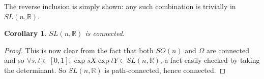 \documentclass[12pt]{article}
\newtheorem{cor}[thm]{Corollary}
\theoremstyle{definition}
\begin{document}
The reverse inclusion is simply shown: any such combination is trivially in $SL(n,\mathbb{R})$. 
\begin{cor}
$SL(n,\mathbb{R})$ is connected.
\end{cor}
\begin{proof}
This is now clear from the fact that both $SO(n)$ and $\Omega$ are connected and so $\forall s,t\in [0,1]: \exp{sX}\exp{tY}\in SL(n,\mathbb{R})$, a fact easily checked by taking the determinant. So $SL(n,\mathbb{R})$ is path-connected, hence connected.
\end{proof}
\end{document}
